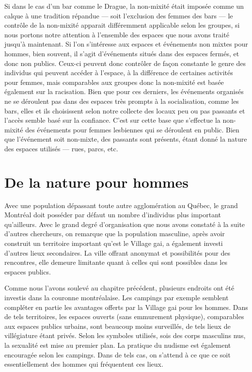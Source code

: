 Si dans le cas d'un bar comme le Drague, la non-mixité était imposée comme un calque à une tradition répandue --- soit l'exclusion des femmes des bars --- le contrôle de la non-mixité apparait différemment applicable selon les groupes, si nous portons notre attention à l'ensemble des espaces que nous avons traité jusqu'à maintenant.
Si l'on s'intéresse aux espaces et événements non mixtes pour hommes, bien souvent, il s'agit d'événements situés dans des espaces fermés, et donc non publics.
Ceux-ci peuvent donc contrôler de façon constante le genre des individus qui peuvent accéder à l'espace, à la différence de certaines activités pour femmes, mais comparables aux groupes donc la non-mixité est basée également sur la racisation.
Bien que pour ces derniers, les événements organisés ne se déroulent pas dans des espaces très prompts à la socialisation, comme les bars, elles et ils choisissent selon notre collecte des locaux peu ou pas passants et l'accès semble basé sur la confiance.
C'est sur cette base que s'effectue la non-mixité des événements pour femmes lesbiennes qui se déroulent en public.
Bien que l'événement soit non-mixte, des passants sont présents, étant donné la nature des espaces utilisés --- rues, parcs, etc.

\section{De la nature pour hommes}
\label{sec:de_la_nature_pour_hommes}
Avec une population dépassant toute autre agglomération au Québec, le grand Montréal doit posséder par défaut un nombre d'individus \lgbt{} plus important qu'ailleurs.
Avec le grand degré d'organisation que nous avons constaté à la suite d'autres chercheurs, on remarque que la population masculine, après avoir construit un territoire important qu'est le Village gai, a également investi d'autres lieux secondaires.
La ville offrant anonymat et possibilités pour des rencontres, elle demeure limitante quant à celles qui sont possibles dans les espaces publics.

Comme nous l'avons soulevé au chapitre précédent, plusieurs endroits ont été investis dans la couronne montréalaise.
Les campings par exemple semblent compléter en partie les avantages offerts par la Village gai pour les hommes.
Dans de tels territoires, les espaces ouverts (sans emmurement physique), comparables aux espaces publics urbains, sont beaucoup moins surveillés, de tels lieux de villégiature étant  privés.
Selon les symboles utilisés, sois des corps masculins nus, la sexualité est mise au premier plan.
La pratique du nudisme est également encouragée selon les campings.
Dans de tels cas, on s'attend à ce que ce soit essentiellement des hommes qui fréquentent ces lieux.

